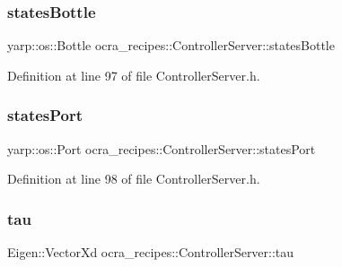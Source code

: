 \hypertarget{classocra__recipes_1_1ControllerServer_a587f8ef2bc028bf845b1713955def5a1}{}\label{classocra__recipes_1_1ControllerServer_a587f8ef2bc028bf845b1713955def5a1} 
\subsubsection{\texorpdfstring{states\+Bottle}{statesBottle}}
{\footnotesize\ttfamily yarp\+::os\+::\+Bottle ocra\+\_\+recipes\+::\+Controller\+Server\+::states\+Bottle\hspace{0.3cm}{\ttfamily [protected]}}



Definition at line 97 of file Controller\+Server.\+h.

\hypertarget{classocra__recipes_1_1ControllerServer_a1d314027131262206280be3e728bf59f}{}\label{classocra__recipes_1_1ControllerServer_a1d314027131262206280be3e728bf59f} 
\subsubsection{\texorpdfstring{states\+Port}{statesPort}}
{\footnotesize\ttfamily yarp\+::os\+::\+Port ocra\+\_\+recipes\+::\+Controller\+Server\+::states\+Port\hspace{0.3cm}{\ttfamily [protected]}}



Definition at line 98 of file Controller\+Server.\+h.

\hypertarget{classocra__recipes_1_1ControllerServer_a07e10b62b84a999c14843662a378ec0f}{}\label{classocra__recipes_1_1ControllerServer_a07e10b62b84a999c14843662a378ec0f} 
\subsubsection{\texorpdfstring{tau}{tau}}
{\footnotesize\ttfamily Eigen\+::\+Vector\+Xd ocra\+\_\+recipes\+::\+Controller\+Server\+::tau\hspace{0.3cm}{\ttfamily [protected]}}



